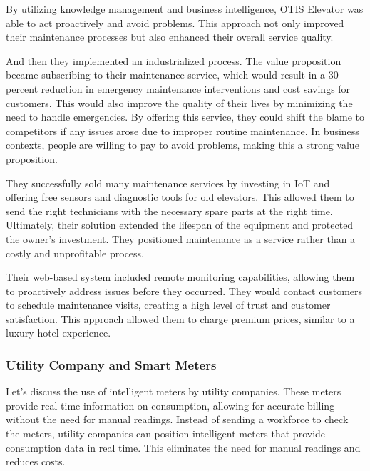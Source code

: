 By utilizing knowledge management and business intelligence, OTIS
Elevator was able to act proactively and avoid problems. This approach
not only improved their maintenance processes but also enhanced their
overall service quality.

And then they implemented an industrialized process. The value
proposition became subscribing to their maintenance service, which would
result in a 30 percent reduction in emergency maintenance interventions
and cost savings for customers. This would also improve the quality of
their lives by minimizing the need to handle emergencies. By offering
this service, they could shift the blame to competitors if any issues
arose due to improper routine maintenance. In business contexts, people
are willing to pay to avoid problems, making this a strong value
proposition.


They successfully sold many maintenance services by
investing in IoT and offering free sensors and diagnostic tools for old
elevators. This allowed them to send the right technicians with the
necessary spare parts at the right time. Ultimately, their solution
extended the lifespan of the equipment and protected the owner's
investment. They positioned maintenance as a service rather than a
costly and unprofitable process.


Their web-based system included remote
monitoring capabilities, allowing them to proactively address issues
before they occurred. They would contact customers to schedule
maintenance visits, creating a high level of trust and customer
satisfaction. This approach allowed them to charge premium prices,
similar to a luxury hotel experience.


\subsubsection{Utility Company and Smart
    Meters}\label{utility-company-and-smart-meters}


Let's discuss the use of intelligent meters by utility companies. These
meters provide real-time information on consumption, allowing for
accurate billing without the need for manual readings. Instead of
sending a workforce to check the meters, utility companies can position
intelligent meters that provide consumption data in real time. This
eliminates the need for manual readings and reduces costs.

